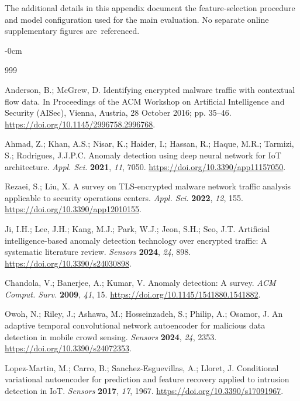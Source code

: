 \documentclass[futureinternet,article,accept,moreauthors]{Definitions/mdpi}
\begin{document}
The additional details in this appendix document the feature-selection procedure and model configuration used for the main evaluation. No separate online supplementary figures are~referenced.




\begin{adjustwidth}{-\extralength}{0cm}

  \begin{thebibliography}{999}
  
  Anderson, B.; McGrew, D. Identifying encrypted malware traffic with contextual flow data. In Proceedings of the ACM Workshop on Artificial Intelligence and Security (AISec), Vienna, Austria, 28 October 2016; pp. 35--46. \url{https://doi.org/10.1145/2996758.2996768}.

  
  Ahmad, Z.; Khan, A.S.; Nisar, K.; Haider, I.; Hassan, R.; Haque, M.R.; Tarmizi, S.; Rodrigues, J.J.P.C. Anomaly detection using deep neural network for IoT architecture. \emph{Appl. Sci.} \textbf{2021}, \emph{11}, 7050. \url{https://doi.org/10.3390/app11157050}.

  
  Rezaei, S.; Liu, X. A survey on TLS-encrypted malware network traffic analysis applicable to security operations centers. \emph{Appl. Sci.} \textbf{2022}, \emph{12}, 155. \url{https://doi.org/10.3390/app12010155}.

  
  Ji, I.H.; Lee, J.H.; Kang, M.J.; Park, W.J.; Jeon, S.H.; Seo, J.T. Artificial intelligence-based anomaly detection technology over encrypted traffic: A systematic literature review. \emph{Sensors} \textbf{2024}, \emph{24}, 898. \url{https://doi.org/10.3390/s24030898}.

  
  Chandola, V.; Banerjee, A.; Kumar, V. Anomaly detection: A survey. \emph{ACM Comput. Surv.} \textbf{2009}, \emph{41}, 15. \url{https://doi.org/10.1145/1541880.1541882}.

  
  Owoh, N.; Riley, J.; Ashawa, M.; Hosseinzadeh, S.; Philip, A.; Osamor, J. An adaptive temporal convolutional network autoencoder for malicious data detection in mobile crowd sensing. \emph{Sensors} \textbf{2024}, \emph{24}, 2353. \url{https://doi.org/10.3390/s24072353}.

  
  Lopez-Martin, M.; Carro, B.; Sanchez-Esguevillas, A.; Lloret, J. Conditional variational autoencoder for prediction and feature recovery applied to intrusion detection in IoT. \emph{Sensors} \textbf{2017}, \emph{17}, 1967. \url{https://doi.org/10.3390/s17091967}.


\end{thebibliography}
\end{adjustwidth}
\end{document}
